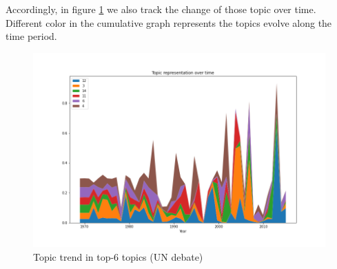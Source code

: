 Accordingly, in figure \ref{fig:stack} we also track the change of those topic over time. Different color in the cumulative graph represents the topics evolve along the time period. \\
\begin{figure}[h]
\centering
\includegraphics[width=0.9\linewidth]{figures/1128/stack}
\caption{Topic trend in top-6 topics (UN debate)}
\label{fig:stack}
\end{figure}
